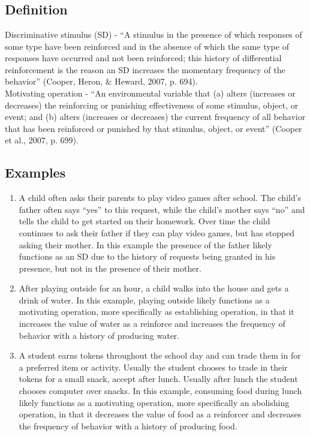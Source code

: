 \section[\fourFKTwentyNine{}]{\fourFKTwentyNine{}%
              }
\subsection{Definition}
Discriminative stimulus (SD) - ``A stimulus in the presence of which responses of some type have been reinforced and in the absence of which the same type of responses have occurred and not been reinforced; this history of differential reinforcement is the reason an SD increases the momentary frequency of the behavior'' (Cooper, Heron, \& Heward, 2007, p. 694).\\

Motivating operation - ``An environmental variable that (a) alters (increases or decreases) the reinforcing or punishing effectiveness of some stimulus, object, or event; and (b) alters (increases or decreases) the current frequency of all behavior that has been reinforced or punished by that stimulus, object, or event'' (Cooper et al., 2007, p. 699).\\
%
\subsection{Examples}
\begin{enumerate}
\item A child often asks their parents to play video games after school. The child's father often says ``yes'' to this request, while the child's mother says ``no'' and tells the child to get started on their homework. Over time the child continues to ask their father if they can play video games, but has stopped asking their mother. In this example the presence of the father likely functions as an SD due to the history of requests being granted in his presence, but not in the presence of their mother.
\item After playing outside for an hour, a child walks into the house and gets a drink of water. In this example, playing outside likely functions as a motivating operation, more specifically as establishing operation, in that it increases the value of water as a reinforce and increases the frequency of behavior with a history of producing water.
\item A student earns tokens throughout the school day and can trade them in for a preferred item or activity. Usually the student chooses to trade in their tokens for a small snack, accept after lunch. Usually after lunch the student chooses computer over snacks. In this example, consuming food during lunch likely functions as a motivating operation, more specifically an abolishing operation, in that it decreases the value of food as a reinforcer and decreases the frequency of behavior with a history of producing food.
%
\end{enumerate}
%
